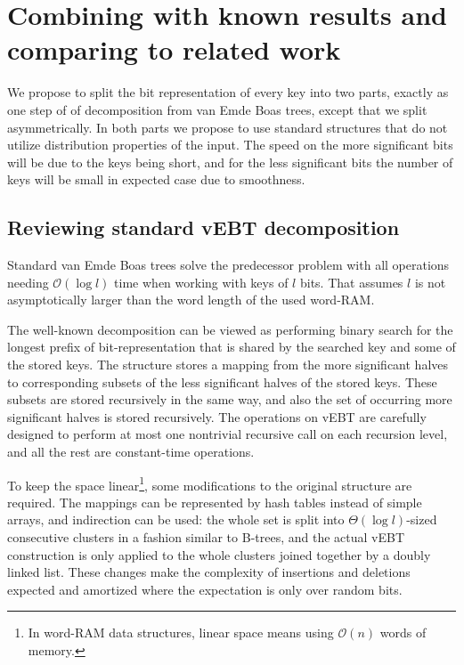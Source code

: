 \documentclass[
submission
]{dmtcs-episciences}
\theoremstyle{plain}
\theoremstyle{definition}
\theoremstyle{remark}
\theoremstyle{plain}
\theoremstyle{plain}
\def\OO{\mathcal O}
\begin{document}

\section{Combining with known results and comparing to related work \label{sec:main-results}}

We propose to split the bit representation of every key into two parts,
exactly as one step of of decomposition from van Emde Boas trees,
except that we split asymmetrically. In both parts we propose to use
standard structures that do not utilize distribution properties of
the input. The speed on the more significant bits will be due to the
keys being short, and for the less significant bits the number of
keys will be small in expected case due to smoothness.

\subsection{Reviewing standard vEBT decomposition}

Standard van Emde Boas trees solve the predecessor problem with all
operations needing $\OO(\log l)$ time when working with keys of $l$
bits. That assumes $l$ is not asymptotically larger than the word
length of the used word-RAM.

The well-known decomposition can be viewed as performing binary search
for the longest prefix of bit-representation that is shared by the
searched key and some of the stored keys. The structure stores a mapping
from the more significant halves to corresponding subsets of the less
significant halves of the stored keys. These subsets are stored recursively
in the same way, and also the set of occurring more significant halves
is stored recursively. The operations on vEBT are carefully designed
to perform at most one nontrivial recursive call on each recursion
level, and all the rest are constant-time operations.

To keep the space linear\footnote{In word-RAM data structures, linear space means using $\OO(n)$ words
of memory.}, some modifications to the original structure are required. The mappings
can be represented by hash tables instead of simple arrays, and indirection
can be used: the whole set is split into $\Theta(\log l)$-sized consecutive
clusters in a fashion similar to B-trees, and the actual vEBT construction
is only applied to the whole clusters joined together by a doubly
linked list. These changes make the complexity of insertions and deletions
expected and amortized where the expectation is only over random bits.
\end{document}
